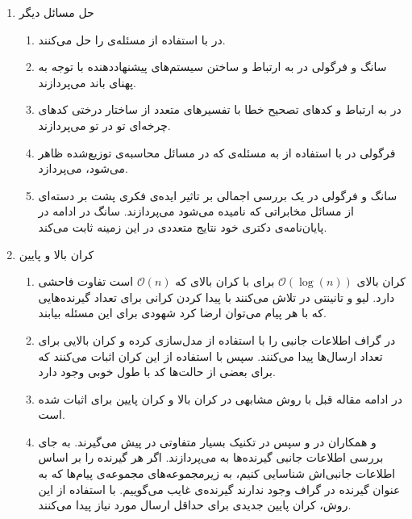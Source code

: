 \begin{enumerate}
\begin{enumerate}
 	\end{enumerate}
 	\item حل مسائل دیگر
 	\begin{enumerate}
 		\item 
 		در
 		\cite{Obead_2023}
 		با استفاده از  
 		\picod
 		مسئله‌ی
 		را حل می‌کنند.
 		\item
 		سانگ و فرگولی در
 		\cite{8404065}
 		به ارتباط 
 		\picod
 		و ساختن سیستم‌های پیشنهاددهنده‌ با توجه به پهنای باند می‌پردازند.
 		\item
 		در
 		\cite{e24081149}
 		به ارتباط 
 		\icod
 		و
 		\picod
 		کدهای تصحیح خطا با تفسیرهای متعدد از ساختار درختی کدهای چرخه‌ای تو در تو
 		می‌پردازند.
 		\item 
 		فرگولی در
 		\cite{datashuf}
 		با استفاده از
 		\picod
 		به مسئله‌ی
 		که در مسائل محاسبه‌ی توزیع‌شده ظاهر می‌شود، می‌پردازد.
 		\item
 		سانگ و فرگولی در
 		\cite{7176784}
 		یک بررسی‌ اجمالی بر تاثیر ایده‌ی فکری پشت
 		\picod
 		بر دسته‌ای از مسائل مخابراتی که
 		نامیده می‌شود می‌پردازند. سانگ در ادامه در پایان‌نامه‌ی دکتری خود
 		\cite{linqiphd}
 		نتایج متعددی در این زمینه ثابت می‌کند.
 	\end{enumerate}
 	\item کران بالا و پایین
 	\begin{enumerate}
 		\item 
 		کران بالای
 		$\mathcal{O}(\log(n))$
 		برای
 		\picod
 		با کران بالای
 		\icod
 		که
 		$\mathcal{O}(n)$
 		است تفاوت فاحشی دارد. لیو و تانینتی در
 		\cite{7606849}
 		تلاش می‌کنند با پیدا کردن کرانی برای تعداد گیرنده‌هایی که با هر پیام می‌توان ارضا کرد شهودی برای این مسئله بیابند.
 		\item 
 		در
 		\cite{9518120}
 		گراف اطلاعات جانبی را با استفاده از 
 		مدل‌سازی کرده و کران بالایی برای تعداد ارسال‌ها پیدا می‌کنند. سپس با استفاده از این کران اثبات می‌کنند که برای بعضی از حالت‌ها کد با طول خوبی وجود دارد.
 		\item
 		در ادامه مقاله قبل با روش مشابهی در
 		\cite{9965883}
 		کران بالا و کران پایین برای
 		\picod
 		اثبات شده است.
 		\item
 		و همکاران در
 		\cite{ong2019improved}
 		و سپس در
 		\cite{8849527}
 		تکنیک بسیار متفاوتی در پیش می‌گیرند. به جای بررسی اطلاعات جانبی گیرنده‌ها به 
 		می‌پردازند. اگر هر گیرنده را بر اساس اطلاعات جانبی‌اش شناسایی کنیم، به زیرمجموعه‌های مجموعه‌ی پیام‌ها که به عنوان گیرنده در گراف وجود ندارند گیرنده‌ی غایب می‌گوییم. با استفاده از این روش، کران پایین جدیدی برای حداقل ارسال مورد نیاز پیدا می‌کنند.
 	\end{enumerate}
 \end{enumerate}
 
